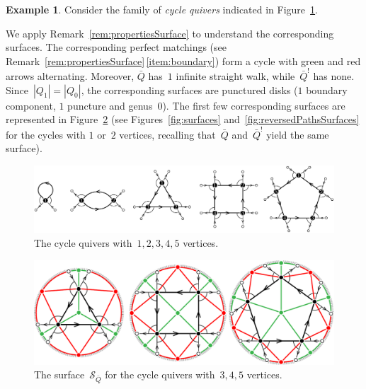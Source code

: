 \documentclass{amsart}
\theoremstyle{definition}
\newtheorem{example}[theorem]{Example}
\newcommand{\fref}[1]{Figure~\ref{#1}} %
\newcommand{\darkblue}{\color{darkblue}} %
\newcommand{\defn}[1]{\textsl{\darkblue #1}} %
\newcommand{\surface}{\mathcal{S}} %
\newcommand{\koszul}{^!} %
\begin{document}
\begin{example}
\label{exm:cycle}
\enlargethispage{1cm}
Consider the family of \defn{cycle quivers} indicated in \fref{fig:cyclesQuivers}.

We apply Remark~\ref{rem:propertiesSurface} to understand the corresponding surfaces.
The corresponding perfect matchings (see Remark~\ref{rem:propertiesSurface}\,\eqref{item:boundary}) form a cycle with green and red arrows alternating.
Moreover, $\bar Q$ has~$1$ infinite straight walk, while~$\bar Q\koszul$ has none.
Since~$|Q_1| = |Q_0|$, the corresponding surfaces are punctured disks ($1$ boundary component, $1$ puncture and genus~$0$).
The first few corresponding surfaces are represented in \fref{fig:cyclesSurfaces} (see Figures~\ref{fig:surfaces} and~\ref{fig:reversedPathsSurfaces} for the cycles with $1$ or~$2$ vertices, recalling that~$\bar Q$ and~$\bar Q\koszul$ yield the same surface).

\begin{figure}[h]
	\capstart
	\centerline{\includegraphics[scale=.45]{cyclesQuivers}}
	\caption{The cycle quivers with~$1, 2, 3, 4, 5$ vertices.}
	\label{fig:cyclesQuivers}
\end{figure}

\begin{figure}[h]
	\capstart
	\centerline{\includegraphics[scale=.7]{cyclesSurfacesBis}}
	\caption{The surface~$\surface_{\bar Q}$ for the cycle quivers with~$3, 4, 5$ vertices.}
	\label{fig:cyclesSurfaces}
\end{figure}
\end{example}
\end{document}
